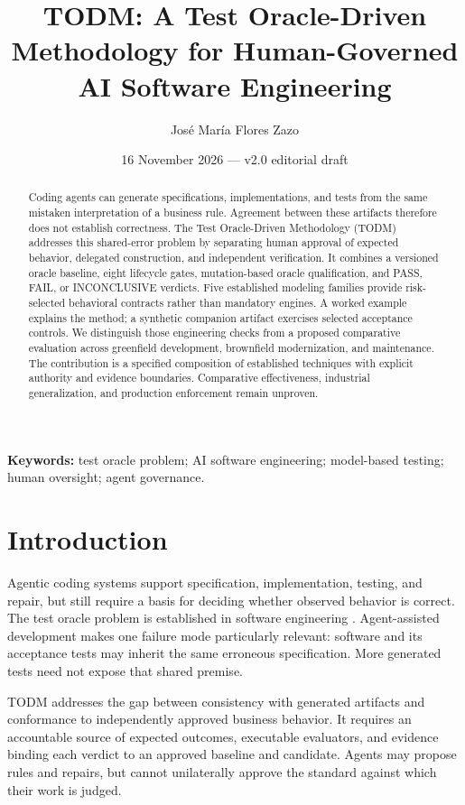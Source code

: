 \documentclass[11pt,a4paper]{article}
\title{\textbf{TODM: A Test Oracle-Driven Methodology for Human-Governed AI Software Engineering}}
\author{Jos\'e Mar\'ia Flores Zazo}
\date{16 November 2026 --- v2.0 editorial draft}
\begin{document}
\maketitle
\begin{abstract}
Coding agents can generate specifications, implementations, and tests from the same mistaken interpretation of a business rule. Agreement between these artifacts therefore does not establish correctness. The Test Oracle-Driven Methodology (TODM) addresses this shared-error problem by separating human approval of expected behavior, delegated construction, and independent verification. It combines a versioned oracle baseline, eight lifecycle gates, mutation-based oracle qualification, and PASS, FAIL, or INCONCLUSIVE verdicts. Five established modeling families provide risk-selected behavioral contracts rather than mandatory engines. A worked example explains the method; a synthetic companion artifact exercises selected acceptance controls. We distinguish those engineering checks from a proposed comparative evaluation across greenfield development, brownfield modernization, and maintenance. The contribution is a specified composition of established techniques with explicit authority and evidence boundaries. Comparative effectiveness, industrial generalization, and production enforcement remain unproven.
\end{abstract}
\noindent\textbf{Keywords:} test oracle problem; AI software engineering; model-based testing; human oversight; agent governance.
\section{Introduction}
Agentic coding systems support specification, implementation, testing, and repair, but still require a basis for deciding whether observed behavior is correct. The test oracle problem is established in software engineering \cite{barr2015oracle}. Agent-assisted development makes one failure mode particularly relevant: software and its acceptance tests may inherit the same erroneous specification. More generated tests need not expose that shared premise.

TODM addresses the gap between consistency with generated artifacts and conformance to independently approved business behavior. It requires an accountable source of expected outcomes, executable evaluators, and evidence binding each verdict to an approved baseline and candidate. Agents may propose rules and repairs, but cannot unilaterally approve the standard against which their work is judged.
\end{document}
